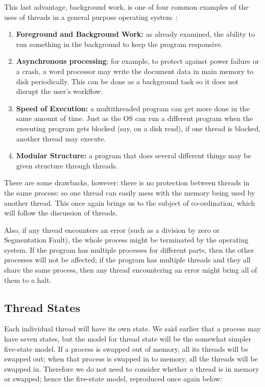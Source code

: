 This last advantage, background work, is one of four common examples of the uses of threads in a general purpose operating system~\cite{insideOS2}:
\begin{enumerate}
	\item \textbf{Foreground and Background Work:} as already examined, the ability to run something in the background to keep the program responsive.
	\item \textbf{Asynchronous processing}: for example, to protect against power failure or a crash, a word processor may write the document data in main memory to disk periodically. This can be done as a background task so it does not disrupt the user's workflow.
	\item \textbf{Speed of Execution:} a multithreaded program can get more done in the same amount of time. Just as the OS can run a different program when the executing program gets blocked (say, on a disk read), if one thread is blocked, another thread may execute.
	\item \textbf{Modular Structure:} a program that does several different things may be given structure through threads.
\end{enumerate}

There are some drawbacks, however: there is no protection between threads in the same process: so one thread can easily mess with the memory being used by another thread. This once again brings us to the subject of co-ordination, which will follow the discussion of threads.

Also, if any thread encounters an error (such as a division by zero or Segmentation Fault), the whole process might be terminated by the operating system. If the program has multiple processes for different parts, then the other processes will not be affected; if the program has multiple threads and they all share the same process, then any thread encountering an error might bring all of them to a halt.


\subsection*{Thread States}
Each individual thread will have its own state. We said earlier that a process may have seven states, but the model for thread state will be the somewhat simpler five-state model. If a process is swapped out of memory, all its threads will be swapped out; when that process is swapped in to memory, all the threads will be swapped in. Therefore we do not need to consider whether a thread is in memory or swapped; hence the five-state model, reproduced once again below:

